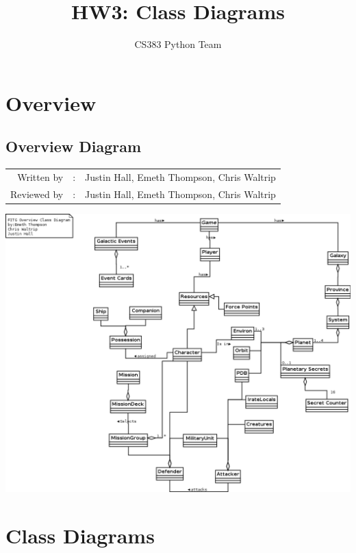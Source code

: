 \documentclass[12pt,letterpaper]{article}
\author{CS383 Python Team}
\title{HW3: Class Diagrams}
\begin{document}
\maketitle
\tableofcontents

\section{Overview}
	\subsection{Overview Diagram}
	\begin{tabularx}{\linewidth}{rcX}
		Written by & : & Justin Hall, Emeth Thompson, Chris Waltrip \\
		Reviewed by & : & Justin Hall, Emeth Thompson, Chris Waltrip \\			 
	\end{tabularx}
			\includegraphics[width=\textwidth,height=\textheight,keepaspectratio]{./images/overview}

\pagebreak
\section{Class Diagrams}
\end{document}
